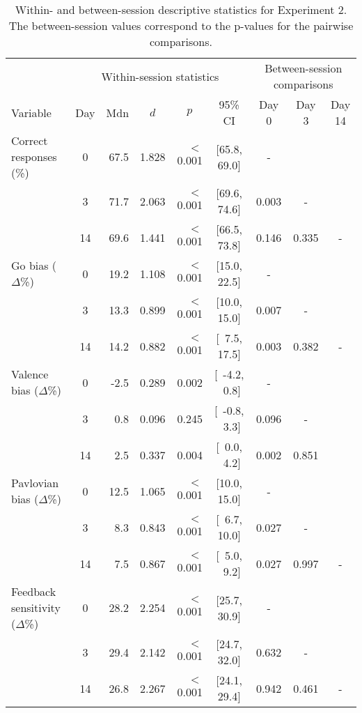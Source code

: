 \documentclass[a4paper,12pt]{article}
\begin{document}
\begin{refsection}[supp]
\begin{table}[h!]
    \centering
    \small
    \begin{adjustbox}{center}
    \begin{tabular}{lcrrrcccc}
        \toprule
                 & \multicolumn{5}{c}{Within-session statistics} & \multicolumn{3}{c}{Between-session comparisons} \\
        \cmidrule(lr){2-6} \cmidrule(lr){7-9}
        Variable & Day & Mdn & \multicolumn{1}{c}{$d$} & \multicolumn{1}{c}{$p$} & 95\% CI & Day 0 & Day 3 & Day 14 \\
        \midrule
         Correct responses (\%)     &  0 & 67.5 &  1.828 & $<$0.001 & [65.8, 69.0] & -     &       &   \\
                                    &  3 & 71.7 &  2.063 & $<$0.001 & [69.6, 74.6] & 0.003 & -     &   \\
                                    & 14 & 69.6 &  1.441 & $<$0.001 & [66.5, 73.8] & 0.146 & 0.335 & - \\
        \midrule
        Go bias ($\Delta$\%)        &  0 & 19.2 &  1.108 & $<$0.001 & [15.0, 22.5] & -     &       &   \\
                                    &  3 & 13.3 &  0.899 & $<$0.001 & [10.0, 15.0]  & 0.007 & -     &  \\
                                    & 14 & 14.2 &  0.882 & $<$0.001 & [\ 7.5, 17.5] & 0.003 & 0.382 & -\\
        \midrule
        Valence bias ($\Delta$\%)   &  0 &  -2.5 &  0.289 &    0.002 & [\ -4.2, \ 0.8] &        - &       &   \\
                                    &  3 &  0.8 &  0.096 &    0.245 & [\ -0.8, \ 3.3]  & 0.096 & -     & \\
                                    & 14 &  2.5 &  0.337 &    0.004 & [\ 0.0, \ 4.2] & 0.002 & 0.851     & \\
        \midrule
        Pavlovian bias ($\Delta$\%) &  0 & 12.5 & 1.065 & $<$0.001 & [10.0, 15.0] &        - &       &   \\
                                    &  3 &  8.3 & 0.843 & $<$0.001 & [\ 6.7, 10.0] & 0.027 & -     & \\
                                    & 14 &  7.5 & 0.867 & $<$0.001 & [\ 5.0, \ 9.2] & 0.027 & 0.997 & -    \\
        \midrule
        \footnotesize Feedback sensitivity ($\Delta$\%) &  0 & 28.2 & 2.254 & $<$0.001 & [25.7, 30.9] &        - &       &  \\
                                    &  3 & 29.4 & 2.142 & $<$0.001 & [24.7, 32.0] & 0.632 & -     &      \\
                                    & 14 & 26.8 & 2.267 & $<$0.001 & [24.1, 29.4] & 0.942 & 0.461 & -    \\
        \bottomrule
    \end{tabular}
    \end{adjustbox}
    \caption{Within- and between-session descriptive statistics for Experiment 2. The between-session values correspond to the p-values for the pairwise comparisons.}
    \label{tab:stats_exp02}
\end{table}


\end{refsection}
\end{document}
